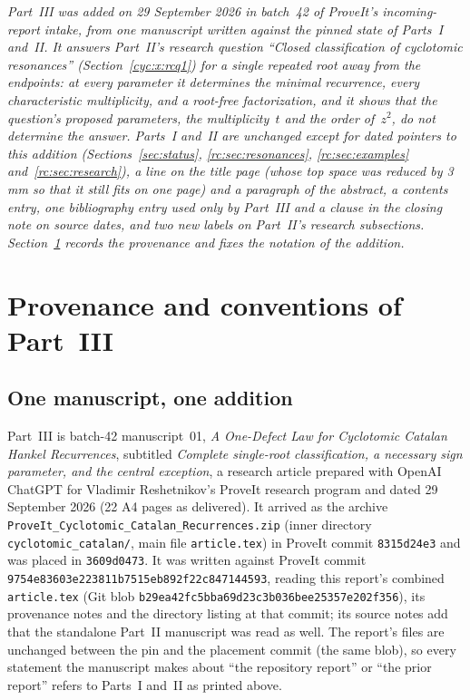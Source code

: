 \documentclass[11pt,a4paper]{article}
\numberwithin{equation}{section}
\theoremstyle{definition}
\theoremstyle{remark}
\begin{document}
\noindent\emph{Part~III was added on 29 September 2026 in batch~42 of
ProveIt's incoming-report intake, from one manuscript written against the
pinned state of Parts~I and~II.  It answers Part~II's research question
``Closed classification of cyclotomic resonances''
(Section~\ref{cyc:x:rcq1}) for a single repeated
root away from the endpoints: at every parameter it determines the minimal
recurrence, every characteristic multiplicity, and a root-free
factorization, and it shows that the question's proposed parameters, the
multiplicity~$t$ and the order of~$z^2$, do not determine the answer.
Parts~I and~II are unchanged except for dated pointers to this addition
(Sections~\ref{sec:status}, \ref{rc:sec:resonances}, \ref{rc:sec:examples}
and~\ref{rc:sec:research}), a line on the title page (whose top space was
reduced by 3\,mm so that it still fits on one page) and a paragraph of the
abstract, a contents entry, one bibliography entry used only by Part~III
and a clause in the closing note on source dates, and two new labels on
Part~II's research subsections.
Section~\ref{cyc:sec:intro} records the provenance and fixes the notation
of the addition.}

\section{Provenance and conventions of Part~III}\label{cyc:sec:intro}

\subsection{One manuscript, one addition}\label{cyc:sec:source}
Part~III is batch-42 manuscript~01, \emph{A One-Defect Law for Cyclotomic
Catalan Hankel Recurrences}, subtitled \emph{Complete single-root
classification, a necessary sign parameter, and the central exception}, a
research article prepared with OpenAI ChatGPT for Vladimir Reshetnikov's
ProveIt research program and dated 29 September 2026 (22 A4 pages as
delivered).  It arrived as the archive
\nolinkurl{ProveIt_Cyclotomic_Catalan_Recurrences.zip} (inner directory
\nolinkurl{cyclotomic_catalan/}, main file \nolinkurl{article.tex}) in
ProveIt commit \texttt{8315d24e3} and was placed in \texttt{3609d0473}.  It
was written against ProveIt commit
\texttt{9754e83603e223811b7515eb892f22c847144593}, reading this report's
combined \nolinkurl{article.tex} (Git blob
\texttt{b29ea42fc5bba69d23c3b036bee25357e202f356}), its provenance notes
and the directory listing at that commit; its source notes add that the
standalone Part~II manuscript was read as well.  The report's files are
unchanged between the pin and the placement commit (the same blob), so
every statement the manuscript makes about ``the repository report'' or
``the prior report'' refers to Parts~I and~II as printed above.
\end{document}

